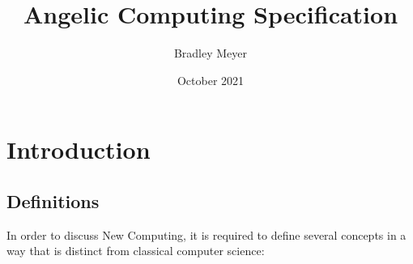 \documentclass[12pt, letterpaper]{article}
\title{Angelic Computing Specification}
\author{Bradley Meyer}
\date{October 2021}
\begin{document}
\maketitle

\begin{abstract}
    
\end{abstract}

\section{Introduction}



\subsection{Definitions}
In order to discuss New Computing, it is required to define several concepts in a way that is distinct from classical computer science:
\end{document}
